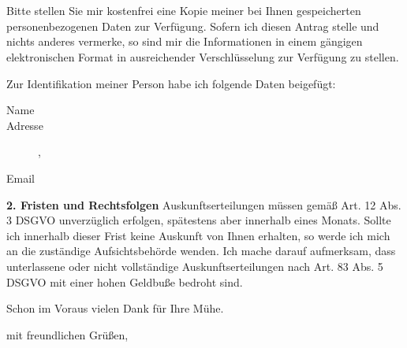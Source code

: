 \documentclass[a4paper, pagenumber=footmiddle, parskip=half,
	foldmarks=true,foldmarks=BmT, fromalign=right,
	fromphone=false, fromfax=false, fromemail=true, fromurl=false, fromlogo=false,
	fromrule=false, version=last]{scrlttr2}
\begin{document}
\begin{letter}{
	\EmpfaengerName\\
	\EmpfaengerStrasse\\
	\EmpfaengerStadt
}
Bitte stellen Sie mir kostenfrei eine Kopie meiner bei Ihnen gespeicherten personenbezogenen Daten zur Verfügung. Sofern ich diesen Antrag stelle und nichts anderes vermerke, so sind mir die Informationen in einem gängigen elektronischen Format in ausreichender Verschlüsselung zur Verfügung zu stellen.

\vspace*{15mm}
Zur Identifikation meiner Person habe ich folgende Daten beigefügt:
\begin{description}
	\item[Name] \meinName{}
	\item[Adresse] \meineStrasse{}, \meineStadt{}
	\item[Email] \meineEmail{}  
\end{description}
\vspace*{5mm}

\textbf{2. Fristen und Rechtsfolgen}
Auskunftserteilungen müssen gemäß Art. 12 Abs. 3 DSGVO unverzüglich erfolgen, spätestens aber innerhalb eines Monats. Sollte ich innerhalb dieser Frist keine Auskunft von Ihnen erhalten, so werde ich mich an die zuständige Aufsichtsbehörde wenden. Ich mache darauf aufmerksam, dass unterlassene oder nicht vollständige Auskunftserteilungen nach Art. 83 Abs. 5 DSGVO mit einer hohen Geldbuße bedroht sind.


Schon im Voraus vielen Dank für Ihre Mühe.

\closing{mit freundlichen Grüßen,}


\end{letter}
\end{document}
